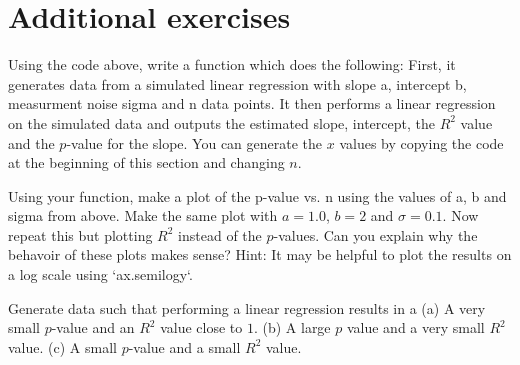 \section{Additional exercises} 
\begin{exercise} Using the code above, write a function which does the following: First, it generates data from a simulated linear regression with slope a, intercept b, measurment noise sigma and n data points. It then performs a linear regression on the simulated data and outputs the estimated slope, intercept, the $R^2$ value and the $p$-value for the slope.
You can generate the $x$ values by copying the code at the beginning of this section and changing $n$. 
\end{exercise}

\begin{exercise} Using your function, make a plot of the p-value vs. n using the values of a, b and sigma from above. Make the same plot with $a = 1.0$, $b = 2$ and $\sigma = 0.1$. Now repeat this but plotting $R^2$ instead of the $p$-values.  Can you explain why the behavoir of these plots makes sense? Hint: It may be helpful to plot the results on a log scale using `ax.semilogy`. 
\end{exercise}

\begin{exercise}
Generate data such that performing a linear regression results in a (a) A very small $p$-value and an $R^2$ value close to $1$. (b) A large $p$ value and a very small $R^2$ value. (c) A small $p$-value and a small $R^2$ value. 
\end{exercise}

